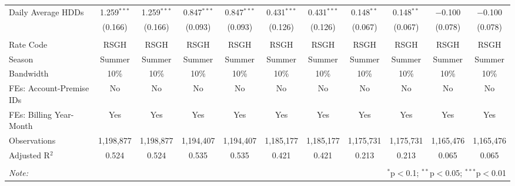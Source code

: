 \begin{table}[!htbp]
\begin{adjustbox}{scale = 0.75}
\begin{tabular}{@{\extracolsep{5pt}}lcccccccccc}
 Daily Average HDDs & 1.259$^{***}$ & 1.259$^{***}$ & 0.847$^{***}$ & 0.847$^{***}$ & 0.431$^{***}$ & 0.431$^{***}$ & 0.148$^{**}$ & 0.148$^{**}$ & $-$0.100 & $-$0.100 \\ 
  & (0.166) & (0.166) & (0.093) & (0.093) & (0.126) & (0.126) & (0.067) & (0.067) & (0.078) & (0.078) \\ 
\hline \\[-1.8ex] 
Rate Code & RSGH & RSGH & RSGH & RSGH & RSGH & RSGH & RSGH & RSGH & RSGH & RSGH \\ 
Season & Summer & Summer & Summer & Summer & Summer & Summer & Summer & Summer & Summer & Summer \\ 
Bandwidth & 10\% & 10\% & 10\% & 10\% & 10\% & 10\% & 10\% & 10\% & 10\% & 10\% \\ 
FEs: Account-Premise IDs & No & No & No & No & No & No & No & No & No & No \\ 
FEs: Billing Year-Month & Yes & Yes & Yes & Yes & Yes & Yes & Yes & Yes & Yes & Yes \\ 
Observations & 1,198,877 & 1,198,877 & 1,194,407 & 1,194,407 & 1,185,177 & 1,185,177 & 1,175,731 & 1,175,731 & 1,165,476 & 1,165,476 \\ 
Adjusted R$^{2}$ & 0.524 & 0.524 & 0.535 & 0.535 & 0.421 & 0.421 & 0.213 & 0.213 & 0.065 & 0.065 \\ 
\hline 
\hline \\[-1.8ex] 
\textit{Note:}  & \multicolumn{10}{r}{$^{*}$p$<$0.1; $^{**}$p$<$0.05; $^{***}$p$<$0.01} \\ 
\end{tabular}
\end{adjustbox}
\end{table} 
